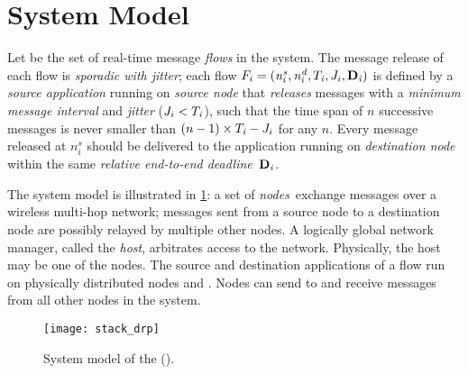 
\section{System Model}
\label{sec:problem}

Let \flowset be the set of real-time message \emph{flows} in the system.
The message release of each flow is \emph{sporadic with jitter}; \ie each flow $F_{i} = (\mathit{n^s_{i}},\mathit{n^d_{i}},T_{\mathit{i}},J_{i},\mathbf{D}_{\mathit{i}})$ is defined by a \emph{source application} running on \emph{source node} \flowsrci that \emph{releases} messages with a \emph{minimum message interval} \periodi and \emph{jitter} \jitteri ($J_{i} < T_{\mathit{i}}$), such that the time span of $n$ successive messages is never smaller than $(n-1)\times T_{\mathit{i}} - J_{i}$ for any $n$. Every message released at $n_i^s$ should be delivered to the application running on \emph{destination node} \flowdsti within the  same \emph{relative end-to-end deadline}~$\mathbf{D}_{\mathit{i}}$.


The system model is illustrated in \cref{fig:DRP_sysmodel}: a set of \emph{nodes}~\nodeset exchange messages over a wireless multi-hop network; messages sent from a source node to a destination node are possibly relayed by multiple other nodes.
A logically global network manager, called the \emph{host}, arbitrates access to the network. Physically, the host may be one of the nodes.
The source and destination applications of a flow \flowi run on physically distributed nodes \flowsrci and \flowdsti.
Nodes can send to and receive messages from all other nodes in the system.

\begin{figure}
  \centering
  \texttt{[image: stack\_drp]}
  \caption{System model of the \DRPLong (\DRP).
  }
  \label{fig:DRP_sysmodel}
\end{figure}

